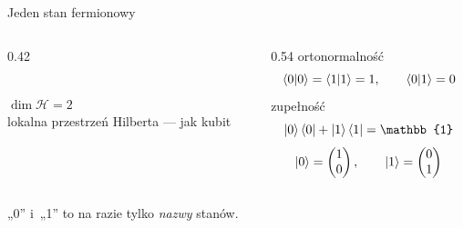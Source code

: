 \documentclass[aspectratio=169,11pt]{beamer}
\newcommand{\uwaga}[1]{\par\vfill{\fontsize{7.5}{9.2}\selectfont\color{mGray}#1\par}}
\newcommand{\duza}[1]{{\tytulowa\fontsize{22}{26}\selectfont #1}}
\newcommand{\podpis}[1]{{\fontsize{7.5}{9}\selectfont\color{mGray}#1}}
\begin{document}
\begin{frame}{Jeden stan fermionowy}
  \begin{columns}[c]
    \begin{column}{0.42\textwidth}
      \centering
      \\[9mm]
      \duza{$\dim\mathcal{H} = 2$}\\
      \podpis{lokalna przestrzeń Hilberta — jak \alert{kubit}}
    \end{column}
    \begin{column}{0.54\textwidth}
      ortonormalność
      \[ \braket{0|0} = \braket{1|1} = 1, \qquad \braket{0|1} = 0 \]
      zupełność
      \[ \ket0\bra0 + \ket1\bra1 = \mathbb{1} \]
      \[
        \ket0 = \begin{pmatrix}1\\0\end{pmatrix}, \qquad
        \ket1 = \begin{pmatrix}0\\1\end{pmatrix}
      \]
    \end{column}
  \end{columns}
  \uwaga{„0” i~„1” to na razie tylko \emph{nazwy} stanów.}
\end{frame}
\end{document}
